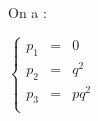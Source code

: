 On a :
\begin{result}
  $\left\{
    \begin{array}{rcl}
      p_1 & = & 0    \\
      p_2 & = & q^2  \\
      p_3 & = & pq^2 \\
    \end{array}
    \right.$
\end{result}
